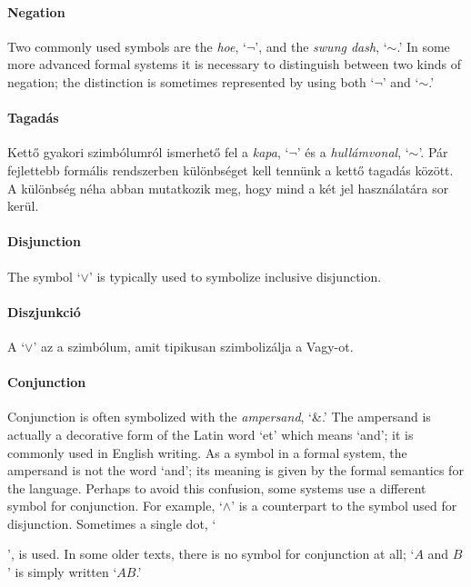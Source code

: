 
\paragraph{Negation} Two commonly used symbols are the \emph{hoe}, `$\neg$', and the \emph{swung dash}, `${\sim}$.' In some more advanced formal systems it is necessary to distinguish between two kinds of negation; the distinction is sometimes represented by using both `$\neg$' and `${\sim}$.'\\[4mm]

\paragraph{Tagadás} Kettő gyakori szimbólumról ismerhető fel a \emph{kapa}, `$\neg$' és a \emph{hullámvonal}, `${\sim}$'. Pár fejlettebb formális rendszerben különbséget kell tennünk a kettő tagadás között. A különbség néha abban mutatkozik meg, hogy mind a két jel használatára sor kerül. \\[4mm]

\paragraph{Disjunction} The symbol `$\vee$' is typically used to symbolize inclusive disjunction. %

\paragraph{Diszjunkció} A `$\vee$' az a szimbólum, amit tipikusan szimbolizálja a Vagy-ot.

\paragraph{Conjunction}
Conjunction is often symbolized with the \emph{ampersand}, `{\&}.' The ampersand is actually a decorative form of the Latin word `et' which means `and'; it is commonly used in English writing. As a symbol in a formal system, the ampersand is not the word `and'; its meaning is given by the formal semantics for the language. Perhaps to avoid this confusion, some systems use a different symbol for conjunction. For example, `$\wedge$' is a counterpart to the symbol used for disjunction. Sometimes a single dot, `\begin{scriptsize}\textbullet\end{scriptsize}', is used. In some older texts, there is no symbol for conjunction at all; `$A$ and $B$' is simply written `$AB$.'

